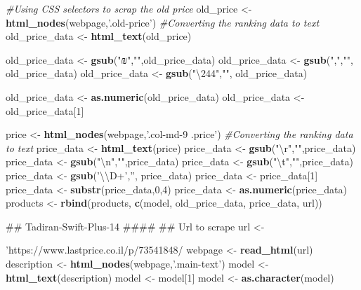 \documentclass[]{article}
\newenvironment{Shaded}{\begin{snugshade}}{\end{snugshade}}
\newcommand{\KeywordTok}[1]{\textcolor[rgb]{0.13,0.29,0.53}{\textbf{#1}}}
\newcommand{\DecValTok}[1]{\textcolor[rgb]{0.00,0.00,0.81}{#1}}
\newcommand{\CharTok}[1]{\textcolor[rgb]{0.31,0.60,0.02}{#1}}
\newcommand{\StringTok}[1]{\textcolor[rgb]{0.31,0.60,0.02}{#1}}
\newcommand{\CommentTok}[1]{\textcolor[rgb]{0.56,0.35,0.01}{\textit{#1}}}
\newcommand{\NormalTok}[1]{#1}
\begin{document}
\begin{Shaded}
\begin{Highlighting}[]
{{{{{{{\CommentTok{#Using CSS selectors to scrap the old price}
\NormalTok{old_price <-}\StringTok{ }\KeywordTok{html_nodes}\NormalTok{(webpage,}\StringTok{'.old-price'}\NormalTok{)}
\CommentTok{#Converting the ranking data to text }
\NormalTok{old_price_data <-}\StringTok{ }\KeywordTok{html_text}\NormalTok{(old_price)}

\NormalTok{old_price_data <-}\StringTok{ }\KeywordTok{gsub}\NormalTok{(}\StringTok{"₪"}\NormalTok{,}\StringTok{""}\NormalTok{,old_price_data)}
\NormalTok{old_price_data <-}\StringTok{ }\KeywordTok{gsub}\NormalTok{(}\StringTok{","}\NormalTok{,}\StringTok{""}\NormalTok{, old_price_data)}
\NormalTok{old_price_data <-}\StringTok{ }\KeywordTok{gsub}\NormalTok{(}\StringTok{"\textbackslash{}244"}\NormalTok{,}\StringTok{""}\NormalTok{, old_price_data)}

\NormalTok{old_price_data <-}\StringTok{ }\KeywordTok{as.numeric}\NormalTok{(old_price_data)}
\NormalTok{old_price_data <-}\StringTok{ }\NormalTok{old_price_data[}\DecValTok{1}\NormalTok{]}

\NormalTok{price <-}\StringTok{ }\KeywordTok{html_nodes}\NormalTok{(webpage,}\StringTok{'.col-md-9 .price'}\NormalTok{)}
\CommentTok{#Converting the ranking data to text }
\NormalTok{price_data <-}\StringTok{ }\KeywordTok{html_text}\NormalTok{(price)}
\NormalTok{price_data <-}\StringTok{ }\KeywordTok{gsub}\NormalTok{(}\StringTok{"}\CharTok{\textbackslash{}r}\StringTok{"}\NormalTok{,}\StringTok{""}\NormalTok{,price_data) }
\NormalTok{price_data <-}\StringTok{ }\KeywordTok{gsub}\NormalTok{(}\StringTok{"}\CharTok{\textbackslash{}n}\StringTok{"}\NormalTok{,}\StringTok{""}\NormalTok{,price_data) }
\NormalTok{price_data <-}\StringTok{ }\KeywordTok{gsub}\NormalTok{(}\StringTok{"}\CharTok{\textbackslash{}t}\StringTok{"}\NormalTok{,}\StringTok{""}\NormalTok{,price_data) }
\NormalTok{price_data <-}\StringTok{ }\KeywordTok{gsub}\NormalTok{(}\StringTok{'}\CharTok{\textbackslash{}\textbackslash{}}\StringTok{D+'}\NormalTok{,}\StringTok{''}\NormalTok{, price_data)}
\NormalTok{price_data <-}\StringTok{ }\NormalTok{price_data[}\DecValTok{1}\NormalTok{]}
\NormalTok{price_data <-}\StringTok{ }\KeywordTok{substr}\NormalTok{(price_data,}\DecValTok{0}\NormalTok{,}\DecValTok{4}\NormalTok{)}
\NormalTok{price_data <-}\StringTok{ }\KeywordTok{as.numeric}\NormalTok{(price_data)}
\NormalTok{products <-}\StringTok{ }\KeywordTok{rbind}\NormalTok{(products, }\KeywordTok{c}\NormalTok{(model, old_price_data, price_data, url))}


\NormalTok{## Tadiran-Swift-Plus-14 ####}
\NormalTok{## Url to scrape}
\NormalTok{url <-}\StringTok{'https://www.lastprice.co.il/p/73541848/%D7%9E%D7%96%D7%92%D7%9F-%D7%A2%D7%99%D7%9C%D7%99-Tadiran/Tadiran-Swift-plus-14A'}
\NormalTok{webpage <-}\StringTok{ }\KeywordTok{read_html}\NormalTok{(url) }
\NormalTok{description <-}\StringTok{ }\KeywordTok{html_nodes}\NormalTok{(webpage,}\StringTok{'.main-text'}\NormalTok{)}
\NormalTok{model <-}\StringTok{ }\KeywordTok{html_text}\NormalTok{(description)}
\NormalTok{model <-}\StringTok{ }\NormalTok{model[}\DecValTok{1}\NormalTok{]}
\NormalTok{model <-}\StringTok{ }\KeywordTok{as.character}\NormalTok{(model)}

}}}}}}}}
\end{Highlighting}
\end{Shaded}
\end{document}
